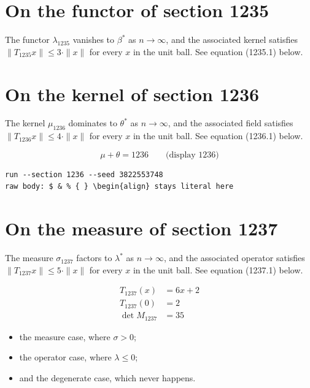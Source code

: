\documentclass{article}
\begin{document}
\section{On the functor of section 1235}
The functor $\lambda_{1235}$ vanishes to $\beta^{*}$ as $n \to \infty$,
and the associated kernel satisfies $\|T_{1235} x\| \leq 3 \cdot \|x\|$
for every $x$ in the unit ball. See equation (1235.1) below.

\section{On the kernel of section 1236}
The kernel $\mu_{1236}$ dominates to $\theta^{*}$ as $n \to \infty$,
and the associated field satisfies $\|T_{1236} x\| \leq 4 \cdot \|x\|$
for every $x$ in the unit ball. See equation (1236.1) below.

$$
\mu + \theta = 1236 \qquad \text{(display 1236)}
$$

\begin{verbatim}
run --section 1236 --seed 3822553748
raw body: $ & % { } \begin{align} stays literal here
\end{verbatim}

\section{On the measure of section 1237}
The measure $\sigma_{1237}$ factors to $\lambda^{*}$ as $n \to \infty$,
and the associated operator satisfies $\|T_{1237} x\| \leq 5 \cdot \|x\|$
for every $x$ in the unit ball. See equation (1237.1) below.

\begin{align}
T_{1237}(x) &= 6 x + 2 \\
T_{1237}(0) &= 2 \\
\det M_{1237} &= 35
\end{align}

\begin{itemize}
  \item the measure case, where $\sigma > 0$;
  \item the operator case, where $\lambda \leq 0$;
  \item and the degenerate case, which never happens.
\end{itemize}
\end{document}
